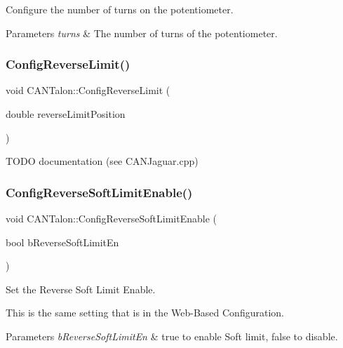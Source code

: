Configure the number of turns on the potentiometer.


\begin{DoxyParams}{Parameters}
{\em turns} & The number of turns of the potentiometer. \\
\hline
\end{DoxyParams}
\mbox{\label{class_c_a_n_talon_ac582a9df1a7224feb27de1c8dbda5ddf}} 
\subsubsection{\texorpdfstring{Config\+Reverse\+Limit()}{ConfigReverseLimit()}}
{\footnotesize\ttfamily void C\+A\+N\+Talon\+::\+Config\+Reverse\+Limit (\begin{DoxyParamCaption}\item[{double}]{reverse\+Limit\+Position }\end{DoxyParamCaption})\hspace{0.3cm}{\ttfamily [override]}}

T\+O\+DO documentation (see C\+A\+N\+Jaguar.\+cpp) \mbox{\label{class_c_a_n_talon_ad0292230bcd7e6431dd0637b1e130a70}} 
\subsubsection{\texorpdfstring{Config\+Reverse\+Soft\+Limit\+Enable()}{ConfigReverseSoftLimitEnable()}}
{\footnotesize\ttfamily void C\+A\+N\+Talon\+::\+Config\+Reverse\+Soft\+Limit\+Enable (\begin{DoxyParamCaption}\item[{bool}]{b\+Reverse\+Soft\+Limit\+En }\end{DoxyParamCaption})}

Set the Reverse Soft Limit Enable.

This is the same setting that is in the Web-\/\+Based Configuration.


\begin{DoxyParams}{Parameters}
{\em b\+Reverse\+Soft\+Limit\+En} & true to enable Soft limit, false to disable. \\
\hline
\end{DoxyParams}
\mbox{\label{class_c_a_n_talon_a247a8434375eb32171058d61f366e7be}} 

